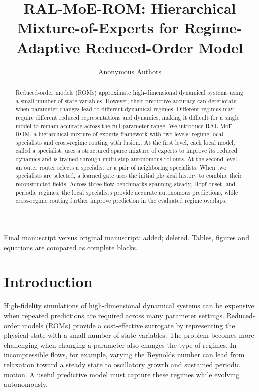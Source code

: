 \documentclass{article}
\title{RAL-MoE-ROM: Hierarchical Mixture-of-Experts for Regime-Adaptive Reduced-Order Model }
\author{Anonymous Authors}
\begin{document}
\raggedbottom

\maketitle
\begin{center}\small Final manuscript versus original manuscript: {\color{blue}added}; {\color{red}deleted}. Tables, figures and equations are compared as complete blocks.\end{center}

\begin{abstract}
Reduced-order models (ROMs) approximate high-dimensional dynamical systems using a small number of state variables. However, their predictive accuracy can deteriorate when parameter changes lead to different dynamical regimes. Different regimes may require different reduced representations and dynamics, making it difficult for a single model to remain accurate across the full parameter range. We introduce RAL-MoE-ROM, a hierarchical mixture-of-experts framework with two levels: regime-local specialists and cross-regime routing with fusion.. At the first level, each local model, called a specialist, uses a structured sparse mixture of experts to improve its reduced dynamics and is trained through multi-step autonomous rollouts. At the second level, an outer router selects a specialist or a pair of neighboring specialists. When two specialists are selected, a learned gate uses the initial physical history to combine their reconstructed fields. Across three flow benchmarks spanning steady, Hopf-onset, and periodic regimes, the local specialists provide accurate autonomous predictions, while cross-regime routing further improve prediction in the evaluated regime overlaps.
\end{abstract}

\section{Introduction}

High-fidelity simulations of high-dimensional dynamical systems
can be expensive when repeated predictions are required across many parameter settings. Reduced-order models (ROMs) provide a cost-effective surrogate by representing the physical state with a small number of state variables. The problem becomes more challenging when changing a parameter also changes the type of regimes. In incompressible flows, for example, varying the Reynolds number can lead from relaxation toward a steady state to oscillatory growth and sustained periodic motion. A useful predictive model must capture these regimes while evolving autonomously.
\end{document}
